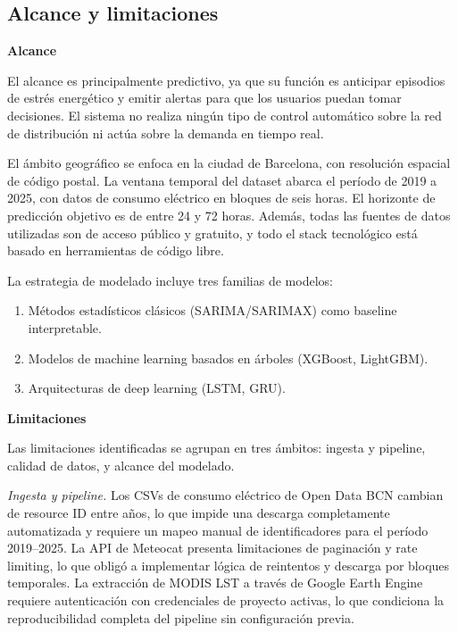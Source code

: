 \documentclass[12pt, a4paper]{article}
\begin{document}
\subsection{Alcance y limitaciones}

\textbf{Alcance}

El alcance es principalmente predictivo, ya que su función es anticipar episodios de estrés energético y emitir alertas para que los usuarios puedan tomar decisiones. El sistema no realiza ningún tipo de control automático sobre la red de distribución ni actúa sobre la demanda en tiempo real.

El ámbito geográfico se enfoca en la ciudad de Barcelona, con resolución espacial de código postal. La ventana temporal del dataset abarca el período de 2019 a 2025, con datos de consumo eléctrico en bloques de seis horas. El horizonte de predicción objetivo es de entre 24 y 72 horas. Además, todas las fuentes de datos utilizadas son de acceso público y gratuito, y todo el stack tecnológico está basado en herramientas de código libre.

La estrategia de modelado incluye tres familias de modelos:
\begin{enumerate}[label=\arabic*.]
    \item Métodos estadísticos clásicos (SARIMA/SARIMAX) como baseline interpretable.
    \item Modelos de machine learning basados en árboles (XGBoost, LightGBM).
    \item Arquitecturas de deep learning (LSTM, GRU).
\end{enumerate}

\textbf{Limitaciones}

Las limitaciones identificadas se agrupan en tres ámbitos: ingesta y pipeline, calidad de datos, y alcance del modelado.

\textit{Ingesta y pipeline.} Los CSVs de consumo eléctrico de Open Data BCN cambian de resource ID entre años, lo que impide una descarga completamente automatizada y requiere un mapeo manual de identificadores para el período 2019--2025. La API de Meteocat presenta limitaciones de paginación y rate limiting, lo que obligó a implementar lógica de reintentos y descarga por bloques temporales. La extracción de MODIS LST a través de Google Earth Engine requiere autenticación con credenciales de proyecto activas, lo que condiciona la reproducibilidad completa del pipeline sin configuración previa.
\end{document}
